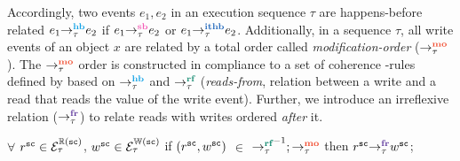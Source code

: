 Accordingly, two events $e_1,e_2$ in an execution sequence $\tau$ are happens-before 
related \ie
$\hb{\tau}{e_1}{e_2}$ if $\seqb{\tau}{e_1}{e_2}$ or $\ithb{\tau}{e_1}{e_2}$.
%
Additionally, in a sequence $\tau$, all write events of an object $x$ are related by a 
total order called {\em modification-order} ($\setMO$).
%
The $\setMO$ order is constructed in compliance to a set of coherence
\lmo-rules defined by \cc \cite{C11}
 based on $\setHB$ and $\setRF$ ({\em reads-from}, 
relation between a write and a read that reads the value of the write event). 
%
Further, we introduce an irreflexive relation  ($\setFR$) to relate  
\sc reads with \sc writes ordered {\em after} it.

\begin{definition}\newline
	$\forall$ $r^\sc \in \ordreads{\sc}_\tau$, $w^\sc \in \ordwrites{\sc}_\tau$
	if $(r^\sc,w^\sc)$ $\in$ $\setRF^{-1};\setMO$ then $\fr{\tau}{r^\sc}{w^\sc}$;
\end{definition}

